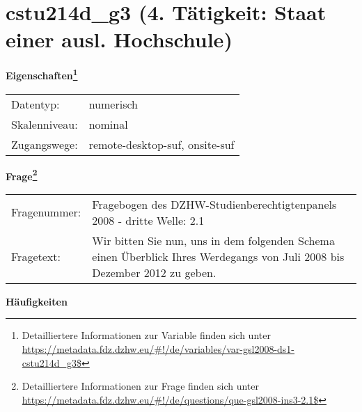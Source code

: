 
    \setcounter{footnote}{0}

    \vspace*{-1.8cm}
	\section{cstu214d\_g3 (4. Tätigkeit: Staat einer ausl. Hochschule)}
	\label{section:cstu214d_g3}



    \vspace*{0.5cm}
    \noindent\textbf{Eigenschaften\footnote{Detailliertere Informationen zur Variable finden sich unter
		\url{https://metadata.fdz.dzhw.eu/\#!/de/variables/var-gsl2008-ds1-cstu214d_g3$}}}\\
	\begin{tabularx}{\hsize}{@{}lX}
	Datentyp: & numerisch \\
	Skalenniveau: & nominal \\
	Zugangswege: &
	  remote-desktop-suf, 
	  onsite-suf
 \\
    \end{tabularx}



				\vspace*{0.5cm}
                \noindent\textbf{Frage\footnote{Detailliertere Informationen zur Frage finden sich unter
		              \url{https://metadata.fdz.dzhw.eu/\#!/de/questions/que-gsl2008-ins3-2.1$}}}\\
				\begin{tabularx}{\hsize}{@{}lX}
					Fragenummer: &
					  Fragebogen des DZHW-Studienberechtigtenpanels 2008 - dritte Welle:
					  2.1
 \\
					Fragetext: & Wir bitten Sie nun, uns in dem folgenden Schema einen Überblick Ihres Werdegangs von Juli 2008 bis Dezember 2012 zu geben. \\
				\end{tabularx}





        		\vspace*{0.5cm}
                \noindent\textbf{Häufigkeiten}

